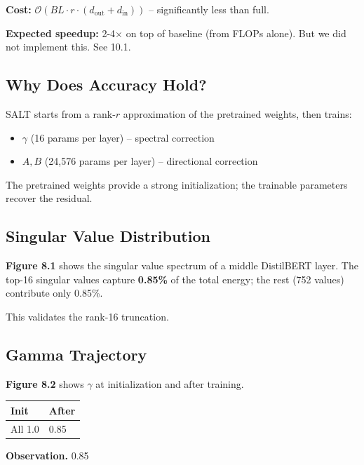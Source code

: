\textbf{Cost:} $\mathcal{O}(BL \cdot r \cdot (d_\text{out} + d_\text{in}))$ -- 
significantly less than full.

\textbf{Expected speedup:} 2-4$\times$ on top of baseline (from FLOPs alone). But we did 
not implement this. See  10.1.

\subsection{Why Does Accuracy Hold?}

SALT starts from a rank-$r$ approximation of the pretrained weights, then 
trains:

\begin{itemize}
\item $\gamma$ (16 params per layer) -- spectral correction
\item $A, B$ (24,576 params per layer) -- directional correction

\end{itemize}
The pretrained weights provide a strong initialization; the trainable 
parameters recover the residual.

\subsection{Singular Value Distribution}

\textbf{Figure 8.1} shows the singular value spectrum of a middle DistilBERT 
layer. The top-16 singular values capture \textbf{0.85\%} of the 
total energy; the rest (752 values) contribute only 0.85\%.

This validates the rank-16 truncation.

\subsection{Gamma Trajectory}

\textbf{Figure 8.2} shows $\gamma$ at initialization and after training.

\begin{table}[H]
\centering
\small
\begin{tabular}{ll}
\toprule
\textbf{Init} & \textbf{After} \\
\midrule
All 1.0 & 0.85 \\
\bottomrule
\end{tabular}
\end{table}

\textbf{Observation.} 0.85

